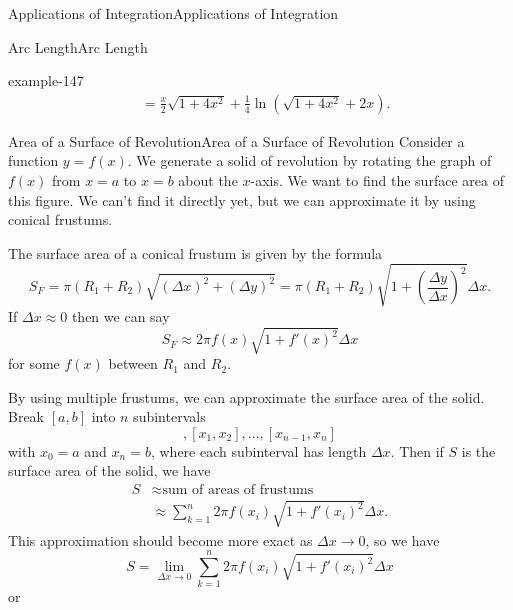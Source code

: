 \documentclass[10pt,]{book}
\numberwithin{equation}{section}
\newcommand{\amp}{&}
\begin{document}
\begin{chapterptx}{Applications of Integration}{}{Applications of Integration}{}{}
\begin{sectionptx}{Arc Length}{}{Arc Length}{}{}
\begin{example}{}{example-147}
\begin{align*}
\amp = \frac{x}{2}\sqrt{1 + 4x^{2}} + \frac{1}{4}\ln(\sqrt{1 + 4x^{2}} + 2x). 
\end{align*}
%
\end{example}
\end{sectionptx}
%
%
\typeout{************************************************}
\typeout{************************************************}
%
\begin{sectionptx}{Area of a Surface of Revolution}{}{Area of a Surface of Revolution}{}{}\label{section-area-of-a-surface-of-revolution}
\hypertarget{p-661}{}%
Consider a function \(y=f(x)\). We generate a solid of revolution by rotating the graph of \(f(x)\) from \(x=a\) to \(x=b\) about the \(x\)-axis. We want to find the surface area of this figure. We can't find it directly yet, but we can approximate it by using conical frustums.%
\par
\hypertarget{p-662}{}%
The surface area of a conical frustum is given by the formula%
\begin{equation*}
S_{F}=\pi(R_{1}+R_{2})\sqrt{(\Delta x)^{2}+(\Delta y)^{2}}=\pi(R_{1}+R_{2})\sqrt{1+\left(\frac{\Delta y}{\Delta x}\right)^{2}}\Delta x.
\end{equation*}
If \(\Delta x\approx0\) then we can say%
\begin{equation*}
S_{F}\approx2\pi f(x)\sqrt{1+f'(x)^{2}}\Delta x
\end{equation*}
for some \(f(x)\) between \(R_{1}\) and \(R_{2}\).%
\par
\hypertarget{p-663}{}%
By using multiple frustums, we can approximate the surface area of the solid. Break \([a,b]\) into \(n\) subintervals%
\begin{equation*}
[x_{0},x_{1}],[x_{1},x_{2}],\ldots,[x_{n-1},x_{n}]
\end{equation*}
with \(x_{0}=a\) and \(x_{n}=b\), where each subinterval has length \(\Delta x\). Then if \(S\) is the surface area of the solid, we have%
\begin{align*}
S\amp\approx\text{sum of areas of frustums}\\
\amp\approx\sum_{k=1}^{n}2\pi f(x_{i})\sqrt{1+f'(x_{i})^{2}}\Delta x.
\end{align*}
This approximation should become more exact as \(\Delta x \to 0\), so we have%
\begin{equation*}
S=\lim_{\Delta x\to0}\sum_{k=1}^{n}2\pi f(x_{i})\sqrt{1+f'(x_{i})^{2}}\Delta x
\end{equation*}
or%
\begin{equation*}

\end{equation*}
\end{sectionptx}
\end{chapterptx}
\end{document}
